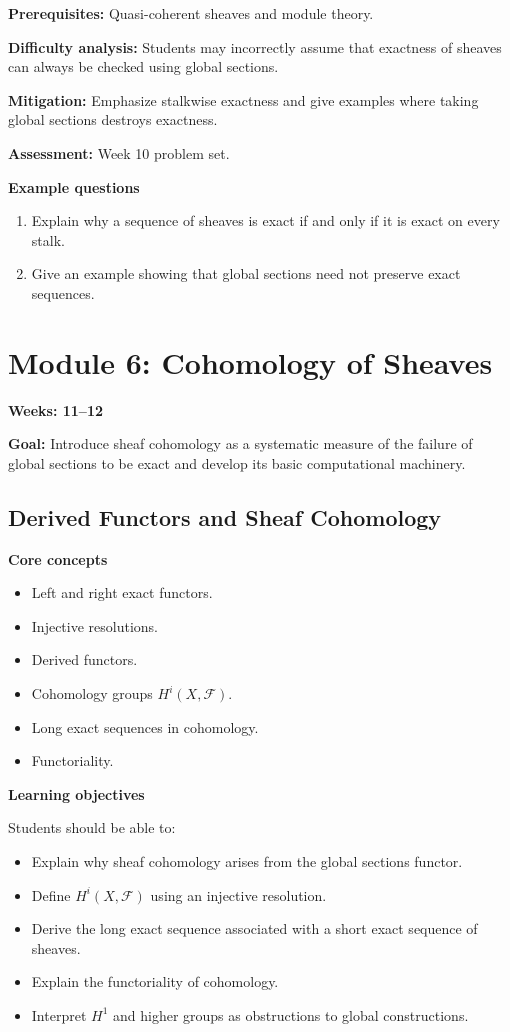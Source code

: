 \documentclass[11pt]{article}
\begin{document}
\textbf{Prerequisites:} Quasi-coherent sheaves and module theory.

\textbf{Difficulty analysis:} Students may incorrectly assume that exactness of sheaves can always be checked using global sections.

\textbf{Mitigation:} Emphasize stalkwise exactness and give examples where taking global sections destroys exactness.

\textbf{Assessment:} Week 10 problem set.

\textbf{Example questions}
\begin{enumerate}
    \item Explain why a sequence of sheaves is exact if and only if it is exact on every stalk.
    \item Give an example showing that global sections need not preserve exact sequences.
\end{enumerate}

\section{Module 6: Cohomology of Sheaves}

\textbf{Weeks: 11--12}

\textbf{Goal:} Introduce sheaf cohomology as a systematic measure of the failure of global sections to be exact and develop its basic computational machinery.

\subsection{Derived Functors and Sheaf Cohomology}

\textbf{Core concepts}
\begin{itemize}
    \item Left and right exact functors.
    \item Injective resolutions.
    \item Derived functors.
    \item Cohomology groups $H^i(X,\mathcal{F})$.
    \item Long exact sequences in cohomology.
    \item Functoriality.
\end{itemize}

\textbf{Learning objectives}

Students should be able to:
\begin{itemize}
    \item Explain why sheaf cohomology arises from the global sections functor.
    \item Define $H^i(X,\mathcal{F})$ using an injective resolution.
    \item Derive the long exact sequence associated with a short exact sequence of sheaves.
    \item Explain the functoriality of cohomology.
    \item Interpret $H^1$ and higher groups as obstructions to global constructions.
\end{itemize}
\end{document}
